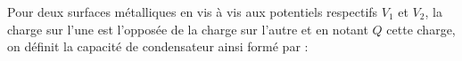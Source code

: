 ﻿\documentclass[a4paper]{article}
\begin{document}
\pagestyle{fancy}
\fancyhf{}
\setlength{\headheight}{15pt}

\begin{center}
	\large{}
\end{center}


Pour deux surfaces métalliques en vis à vis aux potentiels respectifs \(V_1\) et \(V_2\), la charge sur l'une est l'opposée de la charge sur l'autre et en notant \(Q\) cette charge, on définit la capacité de condensateur ainsi formé par :\begin{center}
\end{center}
\end{document}
